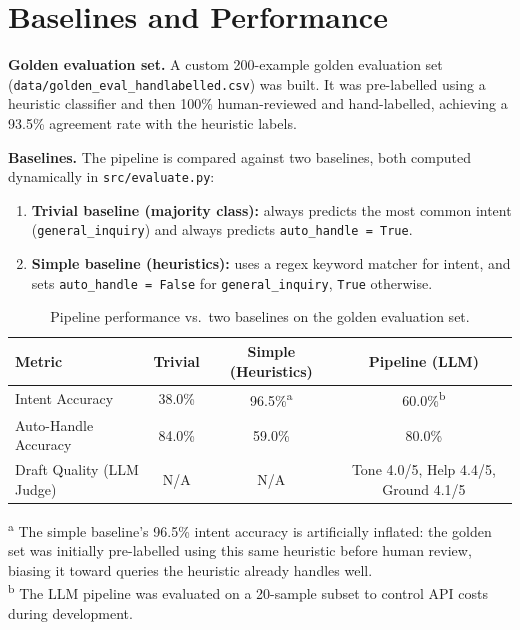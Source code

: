 \documentclass[11pt]{article}
\begin{document}
\section{Baselines and Performance}

\textbf{Golden evaluation set.} A custom 200-example golden evaluation set (\texttt{data/golden\_eval\_handlabelled.csv}) was built. It was pre-labelled using a heuristic classifier and then 100\% human-reviewed and hand-labelled, achieving a 93.5\% agreement rate with the heuristic labels.

\textbf{Baselines.} The pipeline is compared against two baselines, both computed dynamically in \texttt{src/evaluate.py}:
\begin{enumerate}
  \item \textbf{Trivial baseline (majority class):} always predicts the most common intent (\texttt{general\_inquiry}) and always predicts \texttt{auto\_handle = True}.
  \item \textbf{Simple baseline (heuristics):} uses a regex keyword matcher for intent, and sets \texttt{auto\_handle = False} for \texttt{general\_inquiry}, \texttt{True} otherwise.
\end{enumerate}

\begin{table}[h]
\centering
\begin{tabular}{lccc}
\toprule
\textbf{Metric} & \textbf{Trivial} & \textbf{Simple (Heuristics)} & \textbf{Pipeline (LLM)} \\
\midrule
Intent Accuracy      & 38.0\% & 96.5\%\textsuperscript{a} & 60.0\%\textsuperscript{b} \\
Auto-Handle Accuracy & 84.0\% & 59.0\%                     & 80.0\% \\
Draft Quality (LLM Judge) & N/A & N/A & Tone 4.0/5, Help 4.4/5, Ground 4.1/5 \\
\bottomrule
\end{tabular}
\caption{Pipeline performance vs.\ two baselines on the golden evaluation set.}
\end{table}

\footnotesize{\textsuperscript{a} The simple baseline's 96.5\% intent accuracy is artificially inflated: the golden set was initially pre-labelled using this same heuristic before human review, biasing it toward queries the heuristic already handles well.}\\
\footnotesize{\textsuperscript{b} The LLM pipeline was evaluated on a 20-sample subset to control API costs during development.}
\normalsize
\end{document}
